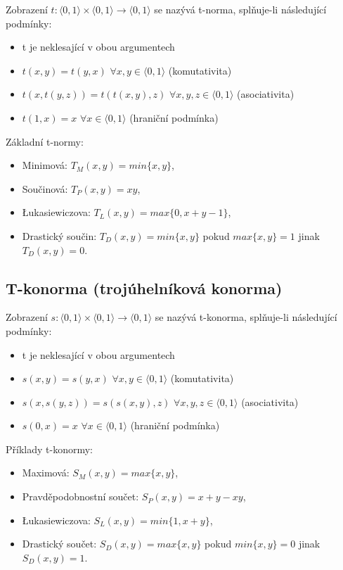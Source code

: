 {\begin{definition}
Zobrazení $t:\langle 0,1\rangle \times \langle 0,1\rangle \rightarrow \langle 0,1\rangle$ se nazývá t-norma, splňuje-li následující podmínky:

\begin{itemize}
\item  t je neklesající v obou argumentech
\item  $t(x,y)=t(y,x)$  $\forall x,y\in \langle 0,1 \rangle$ (komutativita)
\item  $t(x,t(y,z))=t(t(x,y),z) $  $\forall x,y,z\in \langle 0,1 \rangle$ (asociativita)
\item $t(1,x)=x$  $\forall x\in \langle 0,1 \rangle$ (hraniční podmínka)
\end{itemize}
\end{definition}

Základní t-normy:
\begin{itemize}
\item Minimová: $T_M (x,y)=min\{x,y\}$,
\item Součinová: $T_P (x,y)=xy$,
\item Łukasiewiczova: $T_L (x,y)=max\{0,x+y-1\}$,
\item Drastický součin: $T_D(x,y)=min\{x,y\}$ pokud $max\{x,y\}=1$ jinak $T_D(x,y)=0$.
\end{itemize}



\subsection{T-konorma (trojúhelníková konorma)}

\begin{definition}
Zobrazení $s:\langle 0,1\rangle \times \langle 0,1\rangle \rightarrow \langle 0,1\rangle$ se nazývá t-konorma, splňuje-li následující podmínky:
\begin{itemize}
\item  t je neklesající v obou argumentech
\item  $s(x,y)=s(y,x)$  $\forall x,y\in \langle 0,1 \rangle$ (komutativita)
\item  $s(x,s(y,z))=s(s(x,y),z) $  $\forall x,y,z\in \langle 0,1 \rangle$ (asociativita)
\item $s(0,x)=x$  $\forall x\in \langle 0,1 \rangle$ (hraniční podmínka)
\end{itemize}
\end{definition}

Příklady t-konormy:
\begin{itemize}
\item Maximová: $S_M (x,y)=max\{x,y\}$, 
\item Pravděpodobnostní součet: $S_P(x,y)=x+y-xy$, 
\item Łukasiewiczova: $S_L (x,y)=min\{1,x+y\}$,
\item Drastický součet: $S_D(x,y)=max\{x,y\}$ pokud $min\{x,y\}=0$ jinak $S_D(x,y)=1$.
\end{itemize}






}
